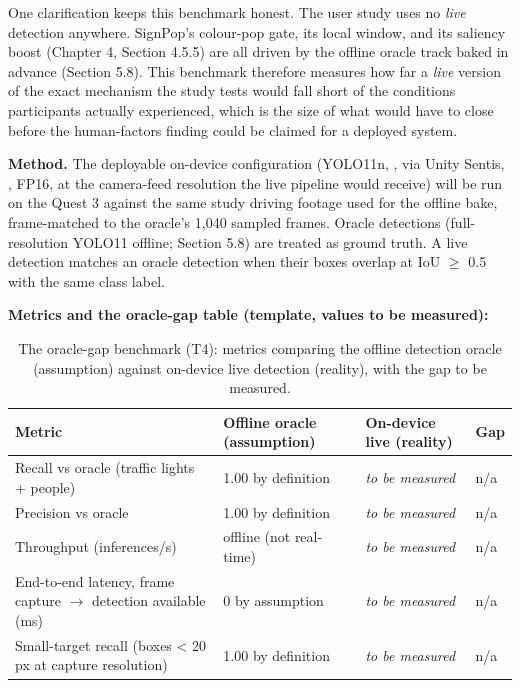 One clarification keeps this benchmark honest. The user study uses no \textit{live} detection anywhere.
SignPop's colour-pop gate, its local window, and its saliency boost (Chapter 4, Section 4.5.5) are
all driven by the offline oracle track baked in advance (Section 5.8). This benchmark therefore
measures how far a \textit{live} version of the exact mechanism the study tests would fall short of the
conditions participants actually experienced, which is the size of what would have to close before
the human-factors finding could be claimed for a deployed system.

\textbf{Method.} The deployable on-device configuration (YOLO11n, \citealp{jocher2024}, via Unity Sentis, \citealp{unity2024}, FP16, at the
camera-feed resolution the live pipeline would receive) will be run on the Quest 3 against the same
study driving footage used for the offline bake, frame-matched to the oracle's 1,040 sampled
frames. Oracle detections (full-resolution YOLO11 offline; Section 5.8) are treated as ground
truth. A live detection matches an oracle detection when their boxes overlap at IoU $\geq$ 0.5 with the
same class label.

\textbf{Metrics and the oracle-gap table (template, values to be measured):}

\begin{longtable}{p{}|p{}|p{}|p{}}
\caption{The oracle-gap benchmark (T4): metrics comparing the offline detection oracle (assumption)
against on-device live detection (reality), with the gap to be measured.}\\
\hline
\textbf{Metric} & \textbf{Offline oracle (assumption)} & \textbf{On-device live (reality)} & \textbf{Gap} \\
\hline
\endhead
\hline
Recall vs oracle (traffic lights + people) & 1.00 by definition & \textit{to be measured} & n/a \\
Precision vs oracle & 1.00 by definition & \textit{to be measured} & n/a \\
Throughput (inferences/s) & offline (not real-time) & \textit{to be measured} & n/a \\
End-to-end latency, frame capture $\rightarrow$ detection available (ms) & 0 by assumption & \textit{to be measured} & n/a \\
Small-target recall (boxes < 20 px at capture resolution) & 1.00 by definition & \textit{to be measured} & n/a \\
\hline
\end{longtable}

